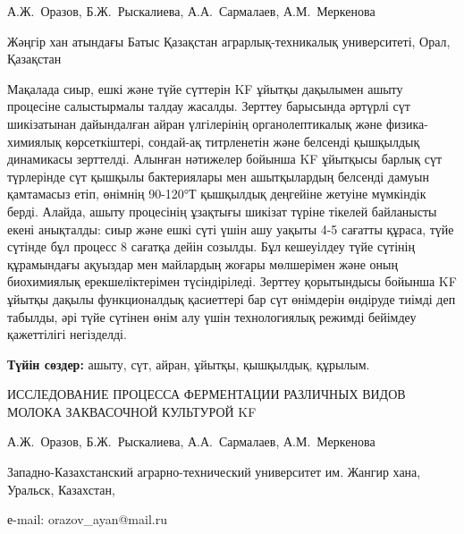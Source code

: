 
\begin{header}

А.Ж.~Оразов\envelope,
Б.Ж.~Рыскалиева,
А.А.~Сармалаев,
А.М.~Меркенова
\end{header}

\begin{affil}
Жәңгір хан атындағы Батыс Қазақстан аграрлық-техникалық университеті, Орал, Қазақстан

\end{affil}

Мақалада сиыр, ешкі және түйе сүттерін KF ұйытқы дақылымен ашыту
процесіне салыстырмалы талдау жасалды. Зерттеу барысында әртүрлі сүт
шикізатынан дайындалған айран үлгілерінің органолептикалық және
физика-химиялық көрсеткіштері, сондай-ақ титрленетін және белсенді
қышқылдық динамикасы зерттелді. Алынған нәтижелер бойынша KF ұйытқысы
барлық сүт түрлерінде сүт қышқылы бактериялары мен ашытқылардың белсенді
дамуын қамтамасыз етіп, өнімнің 90-120°Т қышқылдық деңгейіне жетуіне
мүмкіндік берді. Алайда, ашыту процесінің ұзақтығы шикізат түріне
тікелей байланысты екені анықталды: сиыр және ешкі сүті үшін ашу уақыты
4-5 сағатты құраса, түйе сүтінде бұл процесс 8 сағатқа дейін созылды.
Бұл кешеуілдеу түйе сүтінің құрамындағы ақуыздар мен майлардың жоғары
мөлшерімен және оның биохимиялық ерекшеліктерімен түсіндіріледі. Зерттеу
қорытындысы бойынша KF ұйытқы дақылы функционалдық қасиеттері бар сүт
өнімдерін өндіруде тиімді деп табылды, әрі түйе сүтінен өнім алу үшін
технологиялық режимді бейімдеу қажеттілігі негізделді.

{\bfseries Түйін сөздер:} ашыту, сүт, айран, ұйытқы, қышқылдық, құрылым.

\begin{header}
ИССЛЕДОВАНИЕ ПРОЦЕССА ФЕРМЕНТАЦИИ РАЗЛИЧНЫХ ВИДОВ МОЛОКА ЗАКВАСОЧНОЙ КУЛЬТУРОЙ KF

А.Ж.~Оразов\envelope,
Б.Ж.~Рыскалиева,
А.А.~Сармалаев,
А.М.~Меркенова
\end{header}

\begin{affil}
Западно-Казахстанский аграрно-технический университет им. Жангир хана, Уральск, Казахстан,

е-mail: orazov\_ayan@mail.ru
\end{affil}

